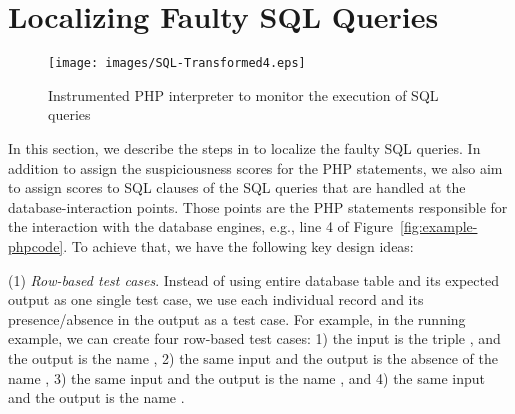 \section{Localizing Faulty SQL Queries}


\begin{figure}[tbp]
  \centering
  \texttt{[image: images/SQL-Transformed4.eps]} %
 \caption{Instrumented PHP interpreter to monitor the execution of SQL queries~\cite{icsm13}}\label{fig:SQL-Transformed}
\end{figure}


In this section, we describe the steps in {\tool} to localize the
faulty SQL queries. In addition to assign the suspiciousness scores
for the PHP statements, we also aim to assign scores to SQL
 clauses of the SQL queries that are handled at the
database-interaction points. Those points are the PHP statements
responsible for the interaction with the database engines, e.g., line
4 of Figure~\ref{fig:example-phpcode}.  To achieve that, we have the
following key design ideas:




(1) {\em Row-based test cases}. Instead of using entire database table
and its expected output as one single test case, we use each
individual record and its presence/absence in the output as a test
case. For example, in the running example, we can create four
row-based test cases: 1) the input is the triple , and the output is the name
, 2) the same input and the output is the absence of the
name , 3) the same input and the output is the name
, and 4) the same input and the output is the name
.

